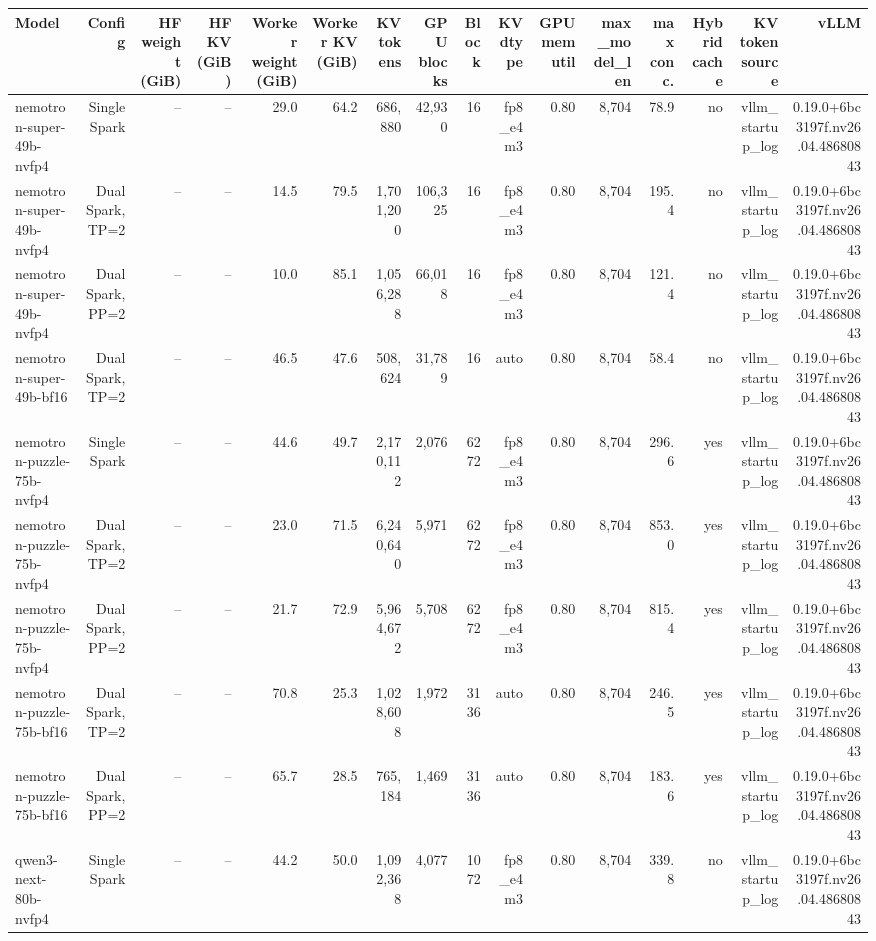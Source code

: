\begin{tabular}{l r r r r r r r r r r r r r r r }
\toprule
Model & Config & HF weight (GiB) & HF KV (GiB) & Worker weight (GiB) & Worker KV (GiB) & KV tokens & GPU blocks & Block & KV dtype & GPU mem util & max\_model\_len & max conc. & Hybrid cache & KV token source & vLLM \\
\midrule
nemotron-super-49b-nvfp4 & Single Spark & -- & -- & 29.0 & 64.2 & 686,880 & 42,930 & 16 & fp8\_e4m3 & 0.80 & 8,704 & 78.9 & no & vllm\_startup\_log & 0.19.0+6bc3197f.nv26.04.48680843 \\
nemotron-super-49b-nvfp4 & Dual Spark, TP=2 & -- & -- & 14.5 & 79.5 & 1,701,200 & 106,325 & 16 & fp8\_e4m3 & 0.80 & 8,704 & 195.4 & no & vllm\_startup\_log & 0.19.0+6bc3197f.nv26.04.48680843 \\
nemotron-super-49b-nvfp4 & Dual Spark, PP=2 & -- & -- & 10.0 & 85.1 & 1,056,288 & 66,018 & 16 & fp8\_e4m3 & 0.80 & 8,704 & 121.4 & no & vllm\_startup\_log & 0.19.0+6bc3197f.nv26.04.48680843 \\
nemotron-super-49b-bf16 & Dual Spark, TP=2 & -- & -- & 46.5 & 47.6 & 508,624 & 31,789 & 16 & auto & 0.80 & 8,704 & 58.4 & no & vllm\_startup\_log & 0.19.0+6bc3197f.nv26.04.48680843 \\
nemotron-puzzle-75b-nvfp4 & Single Spark & -- & -- & 44.6 & 49.7 & 2,170,112 & 2,076 & 6272 & fp8\_e4m3 & 0.80 & 8,704 & 296.6 & yes & vllm\_startup\_log & 0.19.0+6bc3197f.nv26.04.48680843 \\
nemotron-puzzle-75b-nvfp4 & Dual Spark, TP=2 & -- & -- & 23.0 & 71.5 & 6,240,640 & 5,971 & 6272 & fp8\_e4m3 & 0.80 & 8,704 & 853.0 & yes & vllm\_startup\_log & 0.19.0+6bc3197f.nv26.04.48680843 \\
nemotron-puzzle-75b-nvfp4 & Dual Spark, PP=2 & -- & -- & 21.7 & 72.9 & 5,964,672 & 5,708 & 6272 & fp8\_e4m3 & 0.80 & 8,704 & 815.4 & yes & vllm\_startup\_log & 0.19.0+6bc3197f.nv26.04.48680843 \\
nemotron-puzzle-75b-bf16 & Dual Spark, TP=2 & -- & -- & 70.8 & 25.3 & 1,028,608 & 1,972 & 3136 & auto & 0.80 & 8,704 & 246.5 & yes & vllm\_startup\_log & 0.19.0+6bc3197f.nv26.04.48680843 \\
nemotron-puzzle-75b-bf16 & Dual Spark, PP=2 & -- & -- & 65.7 & 28.5 & 765,184 & 1,469 & 3136 & auto & 0.80 & 8,704 & 183.6 & yes & vllm\_startup\_log & 0.19.0+6bc3197f.nv26.04.48680843 \\
qwen3-next-80b-nvfp4 & Single Spark & -- & -- & 44.2 & 50.0 & 1,092,368 & 4,077 & 1072 & fp8\_e4m3 & 0.80 & 8,704 & 339.8 & no & vllm\_startup\_log & 0.19.0+6bc3197f.nv26.04.48680843 \\

\end{tabular}
